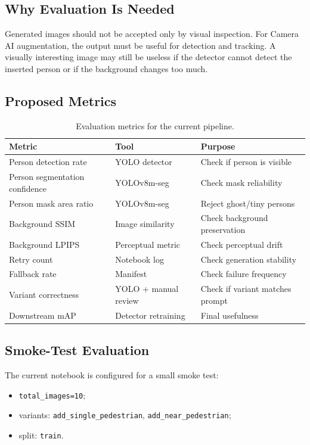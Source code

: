 \documentclass[12pt,a4paper]{article}
\begin{document}
\subsection{Why Evaluation Is Needed}

Generated images should not be accepted only by visual inspection. For Camera AI
augmentation, the output must be useful for detection and tracking. A visually
interesting image may still be useless if the detector cannot detect the
inserted person or if the background changes too much.

\subsection{Proposed Metrics}

\begin{table}[H]
\centering
\caption{Evaluation metrics for the current pipeline.}
\label{tab:evaluation_metrics}
\begin{tabular}{lll}
\toprule
\textbf{Metric} & \textbf{Tool} & \textbf{Purpose} \\
\midrule
Person detection rate & YOLO detector & Check if person is visible \\
Person segmentation confidence & YOLOv8m-seg & Check mask reliability \\
Person mask area ratio & YOLOv8m-seg & Reject ghost/tiny persons \\
Background SSIM & Image similarity & Check background preservation \\
Background LPIPS & Perceptual metric & Check perceptual drift \\
Retry count & Notebook log & Check generation stability \\
Fallback rate & Manifest & Check failure frequency \\
Variant correctness & YOLO + manual review & Check if variant matches prompt \\
Downstream mAP & Detector retraining & Final usefulness \\
\bottomrule
\end{tabular}
\end{table}

\subsection{Smoke-Test Evaluation}

The current notebook is configured for a small smoke test:

\begin{itemize}
    \item \texttt{total\_images=10};
    \item variants: \texttt{add\_single\_pedestrian},
          \texttt{add\_near\_pedestrian};
    \item split: \texttt{train}.
\end{itemize}
\end{document}
